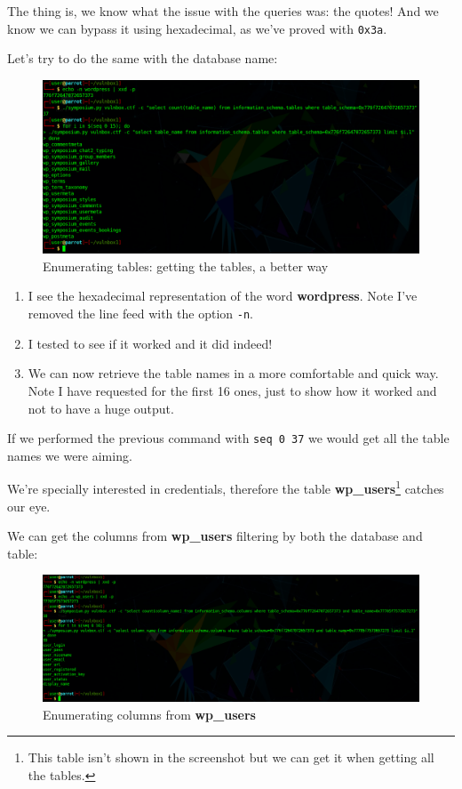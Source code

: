 \documentclass[12pt]{article}
\begin{document}
    The thing is, we know what the issue with the queries was: the quotes!
    And we know we can bypass it using hexadecimal, as we've proved with
    \texttt{0x3a}.

    Let's try to do the same with the database name:

    \begin{figure}[H]\label{pic:29-exploit-tables-3}
        \centering
        \includegraphics[width=1.00\textwidth]{29-exploit-tables-3.png}
        \caption{Enumerating tables: getting the tables, a better way}
    \end{figure}

    \begin{enumerate}
        \item I see the hexadecimal representation of the word
            \textbf{wordpress}. Note I've removed the line feed with the option
            \texttt{-n}.
        \item I tested to see if it worked and it did indeed!
        \item We can now retrieve the table names in a more comfortable and
            quick way. Note I have requested for the first 16 ones, just to
            show how it worked and not to have a huge output.
    \end{enumerate}

    If we performed the previous command with \verb!seq 0 37! we would get all
    the table names we were aiming.

    We're specially interested in credentials, therefore the table
    \textbf{wp\_users}\footnote{This table isn't shown in the screenshot but we
    can get it when getting all the tables.} catches our eye.

    We can get the columns from \textbf{wp\_users} filtering by both the
    database and table:

    \begin{figure}[H]\label{pic:30-exploit-columns}
        \centering
        \includegraphics[width=1.00\textwidth]{30-exploit-columns.png}
        \caption{Enumerating columns from \textbf{wp\_users}}
    \end{figure}
\end{document}
